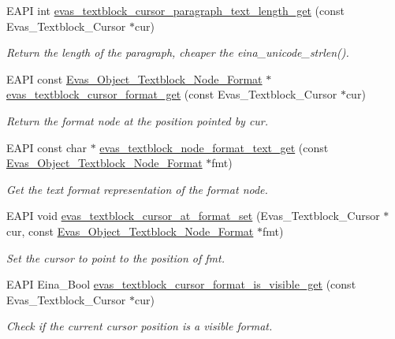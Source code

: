 \begin{DoxyCompactItemize}
EAPI int \hyperlink{group__Evas__Object__Textblock_ga57b2e7d853306c435946e0db83080db5}{evas\_\-textblock\_\-cursor\_\-paragraph\_\-text\_\-length\_\-get} (const Evas\_\-Textblock\_\-Cursor $\ast$cur)
\begin{DoxyCompactList}\small\item\em Return the length of the paragraph, cheaper the eina\_\-unicode\_\-strlen(). \item\end{DoxyCompactList}\item 
EAPI const \hyperlink{Evas_8h_adcd2409468741c89d607f06e17da1f64}{Evas\_\-Object\_\-Textblock\_\-Node\_\-Format} $\ast$ \hyperlink{group__Evas__Object__Textblock_gad4abd947509949e9b683003018481aa3}{evas\_\-textblock\_\-cursor\_\-format\_\-get} (const Evas\_\-Textblock\_\-Cursor $\ast$cur)
\begin{DoxyCompactList}\small\item\em Return the format node at the position pointed by cur. \item\end{DoxyCompactList}\item 
EAPI const char $\ast$ \hyperlink{group__Evas__Object__Textblock_gae386e3627175b7d20a14ad58ddd5aaa8}{evas\_\-textblock\_\-node\_\-format\_\-text\_\-get} (const \hyperlink{Evas_8h_adcd2409468741c89d607f06e17da1f64}{Evas\_\-Object\_\-Textblock\_\-Node\_\-Format} $\ast$fmt)
\begin{DoxyCompactList}\small\item\em Get the text format representation of the format node. \item\end{DoxyCompactList}\item 
EAPI void \hyperlink{group__Evas__Object__Textblock_gabd21b412b8cbc90419cd7d375cc1b625}{evas\_\-textblock\_\-cursor\_\-at\_\-format\_\-set} (Evas\_\-Textblock\_\-Cursor $\ast$cur, const \hyperlink{Evas_8h_adcd2409468741c89d607f06e17da1f64}{Evas\_\-Object\_\-Textblock\_\-Node\_\-Format} $\ast$fmt)
\begin{DoxyCompactList}\small\item\em Set the cursor to point to the position of fmt. \item\end{DoxyCompactList}\item 
EAPI Eina\_\-Bool \hyperlink{group__Evas__Object__Textblock_ga8a85968d8fe24bcb92738df510993d8c}{evas\_\-textblock\_\-cursor\_\-format\_\-is\_\-visible\_\-get} (const Evas\_\-Textblock\_\-Cursor $\ast$cur)
\begin{DoxyCompactList}\small\item\em Check if the current cursor position is a visible format. \item\end{DoxyCompactList}\item 

\end{DoxyCompactItemize}
